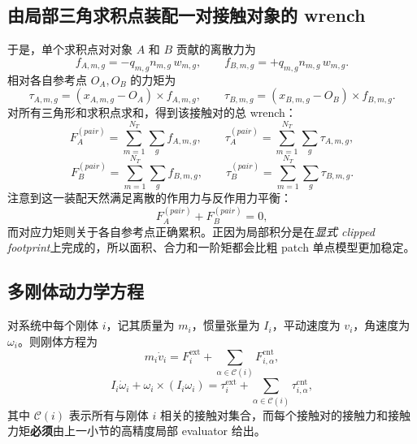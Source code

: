 \documentclass[12pt,a4paper]{ctexart}
\begin{document}
\subsection{由局部三角求积点装配一对接触对象的 wrench}

于是，单个求积点对对象 $A$ 和 $B$ 贡献的离散力为
\begin{equation}
    f_{A,m,g} = - q_{m,g} n_{m,g} \, w_{m,g},
    \qquad
    f_{B,m,g} = + q_{m,g} n_{m,g} \, w_{m,g}.
\end{equation}
相对各自参考点 $O_A,O_B$ 的力矩为
\begin{equation}
    \tau_{A,m,g} = (x_{A,m,g}-O_A)\times f_{A,m,g},
    \qquad
    \tau_{B,m,g} = (x_{B,m,g}-O_B)\times f_{B,m,g}.
\end{equation}
对所有三角形和求积点求和，得到该接触对的总 wrench：
\begin{equation}
    F_A^{(pair)} = \sum_{m=1}^{N_T}\sum_g f_{A,m,g},
    \qquad
    \tau_A^{(pair)} = \sum_{m=1}^{N_T}\sum_g \tau_{A,m,g},
\end{equation}
\begin{equation}
    F_B^{(pair)} = \sum_{m=1}^{N_T}\sum_g f_{B,m,g},
    \qquad
    \tau_B^{(pair)} = \sum_{m=1}^{N_T}\sum_g \tau_{B,m,g}.
\end{equation}
注意到这一装配天然满足离散的作用力与反作用力平衡：
\begin{equation}
    F_A^{(pair)} + F_B^{(pair)} = 0,
\end{equation}
而对应力矩则关于各自参考点正确累积。正因为局部积分是在\emph{显式 clipped footprint}上完成的，所以面积、合力和一阶矩都会比粗 patch 单点模型更加稳定。

\subsection{多刚体动力学方程}

对系统中每个刚体 $i$，记其质量为 $m_i$，惯量张量为 $I_i$，平动速度为 $v_i$，角速度为 $\omega_i$。则刚体方程为
\begin{equation}
    m_i \dot v_i = F_i^{\mathrm{ext}} + \sum_{\alpha\in\mathcal C(i)} F_{i,\alpha}^{\mathrm{cnt}},
\end{equation}
\begin{equation}
    I_i \dot \omega_i + \omega_i\times(I_i\omega_i)
    = \tau_i^{\mathrm{ext}} + \sum_{\alpha\in\mathcal C(i)} \tau_{i,\alpha}^{\mathrm{cnt}},
\end{equation}
其中 $\mathcal C(i)$ 表示所有与刚体 $i$ 相关的接触对集合，而每个接触对的接触力和接触力矩\textbf{必须}由上一小节的高精度局部 evaluator 给出。
\end{document}
